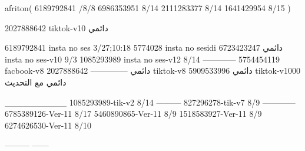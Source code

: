 afriton(
6189792841 /8/8
6986353951 8/14
2111283377 8/14
1641429954 8/15
)

2027888642 tiktok-v10
دائمي

6189792841 insta no ses
3/27;10:18
5774028 insta no sesidi
دائمي
6723423247 insta no ses-v10
9/3
1085293989 insta no ses-v12
8/14
------------
5754454119 facbook-v8
دائمي
--------------
2027888642 tiktok-v8
دائمي
5909533996 tiktok-v1000
دائمي مع التحديث

__________
1085293989-tik-v2
8/14
---------
827296278-tik-v7
8/9
------------
6785389126-Ver-11
8/17
5460890865-Ver-11
8/9
1518583927-Ver-11
8/9
6274626530-Ver-11
8/10

---------
------
